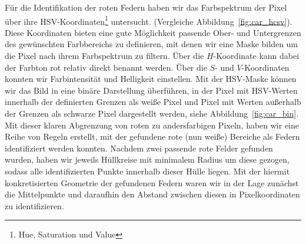 \documentclass[10pt]{article}
\begin{document}
    Für die Identifikation der roten Federn haben wir das Farbspektrum der Pixel über ihre HSV-Koordinaten\footnote{Hue, Saturation und Value} untersucht. (Vergleiche Abbildung~\ref{fig:car_hcsv}).  
    Diese Koordinaten bieten eine gute Möglichkeit passende Ober- und Untergrenzen des gewünschten Farbbereichs zu definieren, mit denen wir eine Maske bilden um die Pixel nach ihrem Farbspektrum zu filtern.
    Über die $H$-Koordinate kann dabei der Farbton rot relativ direkt benannt werden.
    Über die $S$- und $V$-Koordinaten konnten wir Farbintensität und Helligkeit einstellen.
    Mit der HSV-Maske können wir das Bild in eine binäre Darstellung überführen, in der Pixel mit HSV-Werten innerhalb der definierten Grenzen als weiße Pixel und Pixel mit Werten außerhalb der Grenzen als schwarze Pixel dargestellt werden, siehe Abbildung~\ref{fig:car_bin}.
    Mit dieser klaren Abgrenzung von roten zu andersfarbigen Pixeln, haben wir eine Reihe von Regeln erstellt, mit der gefundene rote (nun weiße) Bereiche als Federn identifiziert werden konnten.
    Nachdem zwei passende rote Felder gefunden wurden, haben wir jeweils Hüllkreise mit minimalem Radius um diese gezogen, sodass alle identifizierten Punkte innerhalb dieser Hülle liegen.
    Mit der hiermit konkretisierten Geometrie der gefundenen Federn waren wir in der Lage zunächst die Mittelpunkte und daraufhin den Abstand zwischen diesen in Pixelkoordinaten zu identifizieren.
    
\end{document}
